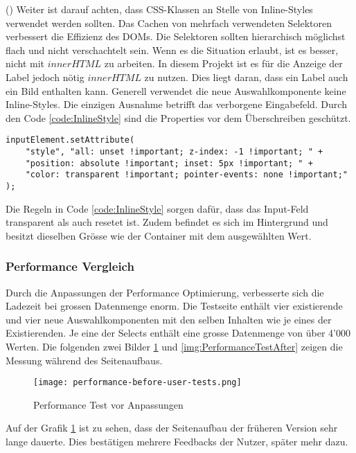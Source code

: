 (\cite{efficientDomManipulation}) Weiter ist darauf achten, dass CSS-Klassen an Stelle von Inline-Styles verwendet werden sollten.
Das Cachen von mehrfach verwendeten Selektoren verbessert die Effizienz des DOMs.
Die Selektoren sollten hierarchisch möglichst flach und nicht verschachtelt sein.
Wenn es die Situation erlaubt, ist es besser, nicht mit $innerHTML$ zu arbeiten.
In diesem Projekt ist es für die Anzeige der Label jedoch nötig $innerHTML$ zu nutzen.
Dies liegt daran, dass ein Label auch ein Bild enthalten kann.
Generell verwendet die neue Auswahlkomponente keine Inline-Styles.
Die einzigen Ausnahme betrifft das verborgene Eingabefeld. 
Durch den Code \ref{code:InlineStyle} sind die Properties vor dem Überschreiben geschützt.

\begin{lstlisting}[style = htmlcssjs, caption = Inline-Style für Inputfeld, label = code:InlineStyle]
inputElement.setAttribute(
    "style", "all: unset !important; z-index: -1 !important; " +
    "position: absolute !important; inset: 5px !important; " +
    "color: transparent !important; pointer-events: none !important;"
);
\end{lstlisting}

Die Regeln in Code \ref{code:InlineStyle} sorgen dafür, dass das Input-Feld transparent als auch resetet ist.
Zudem befindet es sich im Hintergrund und besitzt dieselben Grösse wie der Container mit dem ausgewählten Wert.

\subsubsection{\color{dgray} Performance Vergleich}

Durch die Anpassungen der Performance Optimierung, verbesserte sich die Ladezeit bei grossen Datenmenge enorm.
Die Testseite enthält vier existierende und vier neue Auswahlkomponenten mit den selben Inhalten wie je eines der Existierenden.
Je eine der Selects enthält eine grosse Datenmenge von über 4'000 Werten.
Die folgenden zwei Bilder \ref{img:PerformanceTestBefore} und \ref{img:PerformanceTestAfter} zeigen die Messung während des Seitenaufbaus.

\begin{figure}[!htb]
    \centering
    \texttt{[image: performance-before-user-tests.png]}
    \caption{Performance Test vor Anpassungen}
    \label{img:PerformanceTestBefore}
\end{figure}

Auf der Grafik \ref{img:PerformanceTestBefore} ist zu sehen, dass der Seitenaufbau der früheren Version sehr lange dauerte.
Dies bestätigen mehrere Feedbacks der Nutzer, später mehr dazu.


